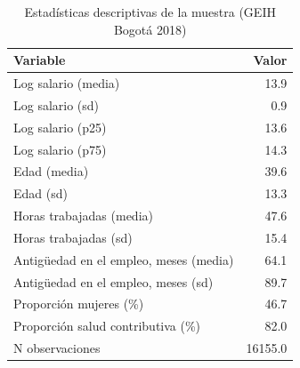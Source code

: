\begin{table}[ht]
\centering
\begin{tabular}{lr}
  \toprule
Variable & Valor \\ 
  \midrule
Log salario (media) & 13.9 \\ 
  Log salario (sd) & 0.9 \\ 
  Log salario (p25) & 13.6 \\ 
  Log salario (p75) & 14.3 \\ 
  Edad (media) & 39.6 \\ 
  Edad (sd) & 13.3 \\ 
  Horas trabajadas (media) & 47.6 \\ 
  Horas trabajadas (sd) & 15.4 \\ 
  Antigüedad en el empleo, meses (media) & 64.1 \\ 
  Antigüedad en el empleo, meses (sd) & 89.7 \\ 
  Proporción mujeres (\%) & 46.7 \\ 
  Proporción salud contributiva (\%) & 82.0 \\ 
  N observaciones & 16155.0 \\ 
   \bottomrule
\end{tabular}
\caption{Estadísticas descriptivas de la muestra (GEIH Bogotá 2018)} 
\label{tab:desc}
\end{table}
